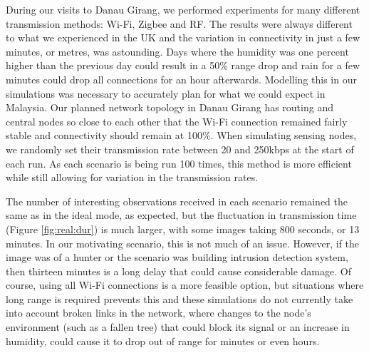 During our visits to Danau Girang, we performed experiments for many different transmission methods: Wi-Fi, Zigbee and RF. The results were always different to what we experienced in the UK and the variation in connectivity in just a few minutes, or metres, was astounding. Days where the humidity was one percent higher than the previous day could result in a 50\% range drop and rain for a few minutes could drop all connections for an hour afterwards. Modelling this in our simulations was necessary to accurately plan for what we could expect in Malaysia. Our planned network topology in Danau Girang has routing and central nodes so close to each other that the Wi-Fi connection remained fairly stable and connectivity should remain at 100\%. When simulating sensing nodes, we randomly set their transmission rate between 20 and 250kbps at the start of each run. As each scenario is being run 100 times, this method is more efficient while still allowing for variation in the transmission rates. 

The number of interesting observations received in each scenario remained the same as in the ideal mode, as expected, but the fluctuation in transmission time (Figure \ref{fig:real:dur}) is much larger, with some images taking 800 seconds, or 13 minutes. In our motivating scenario, this is not much of an issue. However, if the image was of a hunter or the scenario was building intrusion detection system, then thirteen minutes is a long delay that could cause considerable damage. Of course, using all Wi-Fi connections is a more feasible option, but situations where long range is required prevents this and these simulations do not currently take into account broken links in the network, where changes to the node's environment (such as a fallen tree) that could block its signal or an increase in humidity, could cause it to drop out of range for minutes or even hours. 

